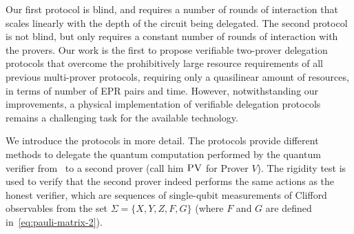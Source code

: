 \documentclass[11pt]{article}
\newcommand{\eps}{\varepsilon}
\newcommand{\pv}{\textsc{PV}}
\begin{document}
Our first protocol is blind, and requires a number of rounds of interaction that
scales linearly with the depth of the circuit being delegated. The second
protocol is not blind, but only requires a constant number of rounds of
interaction with the provers. Our work is the first to propose verifiable two-prover delegation protocols that overcome the prohibitively large resource requirements of all previous multi-prover protocols, requiring only a quasilinear amount of resources, in terms of number of EPR pairs and time. However, notwithstanding our improvements, a physical implementation  of verifiable delegation protocols remains a challenging task for the available technology.
 



We introduce the protocols in more detail. The protocols provide different methods to delegate the quantum computation performed by the quantum verifier from~\cite{broadbent15howtoverify} to a second prover (call him $\pv$ for Prover $V$). The rigidity test is used to verify that the second prover indeed performs the same actions as the honest verifier, which are sequences of single-qubit measurements of Clifford observables from the set $\Sigma = \{X,Y,Z,F,G\}$ (where $F$ and $G$ are defined in~\eqref{eq:pauli-matrix-2}).
\end{document}
